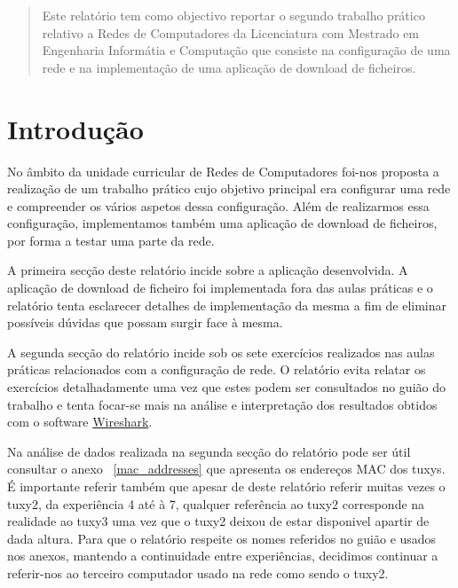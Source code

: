 \documentclass[11pt,a4paper,reqno]{report}
\numberwithin{equation}{section}
\begin{document}



\begin{abstract}
	
Este relatório tem como objectivo reportar o segundo trabalho prático relativo a Redes de Computadores da Licenciatura com Mestrado em Engenharia Informátia e Computação que consiste na configuração de uma rede e na implementação de uma aplicação de download de ficheiros.


\end{abstract}

\tableofcontents

\chapter{Introdução}

No âmbito da unidade curricular de Redes de Computadores foi-nos proposta a realização de um trabalho prático cujo objetivo principal era configurar uma rede e compreender os vários aspetos dessa configuração. Além de realizarmos essa configuração, implementamos também uma aplicação de download de ficheiros, por forma a testar uma parte da rede.

A primeira secção deste relatório incide sobre a aplicação desenvolvida. A aplicação de download de ficheiro foi implementada fora das aulas práticas e o relatório tenta esclarecer detalhes de implementação da mesma a fim de eliminar possíveis dúvidas que possam surgir face à mesma.

A segunda secção do relatório incide sob os sete exercícios realizados nas aulas práticas relacionados com a configuração de rede. O relatório evita relatar os exercícios detalhadamente uma vez que estes podem ser consultados no guião do trabalho e tenta focar-se mais na análise e interpretação dos resultados obtidos com o software \href{https://www.wireshark.org/}{Wireshark}.

Na análise de dados realizada na segunda secção do relatório pode ser útil consultar o anexo ~\ref{mac_addresses} que apresenta os endereços MAC dos tuxys. É importante referir também que apesar de deste relatório referir muitas vezes o tuxy2, da experiência 4 até à 7, qualquer referência ao tuxy2 corresponde na realidade ao tuxy3 uma vez que o tuxy2 deixou de estar disponivel apartir de dada altura. Para que o relatório respeite os nomes referidos no guião e usados nos anexos, mantendo a continuidade entre experiências, decidimos continuar a referir-nos ao terceiro computador usado na rede como sendo o tuxy2.  
	
\end{document}

